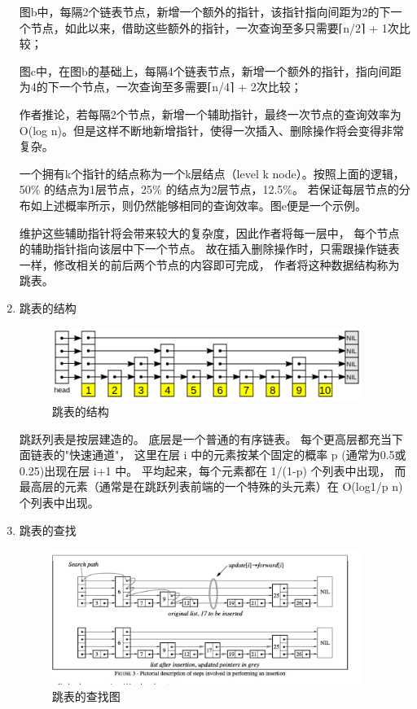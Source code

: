 \begin{enumerate}
		图b中，每隔2个链表节点，新增一个额外的指针，该指针指向间距为2的下一个节点，如此以来，借助这些额外的指针，一次查询至多只需要⌈n/2⌉ + 1次比较；

		图c中，在图b的基础上，每隔4个链表节点，新增一个额外的指针，指向间距为4的下一个节点，一次查询至多需要⌈n/4⌉ + 2次比较；

		作者推论，若每隔2个节点，新增一个辅助指针，最终一次节点的查询效率为O(log n)。但是这样不断地新增指针，使得一次插入、删除操作将会变得非常复杂。

		一个拥有k个指针的结点称为一个k层结点（level k node）。按照上面的逻辑，50\% 的结点为1层节点，25\% 的结点为2层节点，12.5\%。
		若保证每层节点的分布如上述概率所示，则仍然能够相同的查询效率。图e便是一个示例。

		维护这些辅助指针将会带来较大的复杂度，因此作者将每一层中，
		每个节点的辅助指针指向该层中下一个节点。
		故在插入删除操作时，只需跟操作链表一样，修改相关的前后两个节点的内容即可完成，
		作者将这种数据结构称为跳表。


		\item 跳表的结构
		
		\begin{figure}[H]
			\centering
			\includegraphics[width=0.95\textwidth]{images/skiplist_arch}
			\caption{跳表的结构}
			\label{skiplist_arch}
		\end{figure}

		跳跃列表是按层建造的。
		底层是一个普通的有序链表。
		每个更高层都充当下面链表的"快速通道"，
		这里在层 i 中的元素按某个固定的概率 p (通常为0.5或0.25)出现在层 i+1 中。
		平均起来，每个元素都在 1/(1-p) 个列表中出现，
		而最高层的元素（通常是在跳跃列表前端的一个特殊的头元素）在 O(log1/p n) 个列表中出现。

		\item 跳表的查找
		
		\begin{figure}[H]
			\centering
			\includegraphics[width=0.95\textwidth]{images/skiplist_search}
			\caption{跳表的查找图}
			\label{skiplist_search}
		\end{figure}
		

\end{enumerate}
